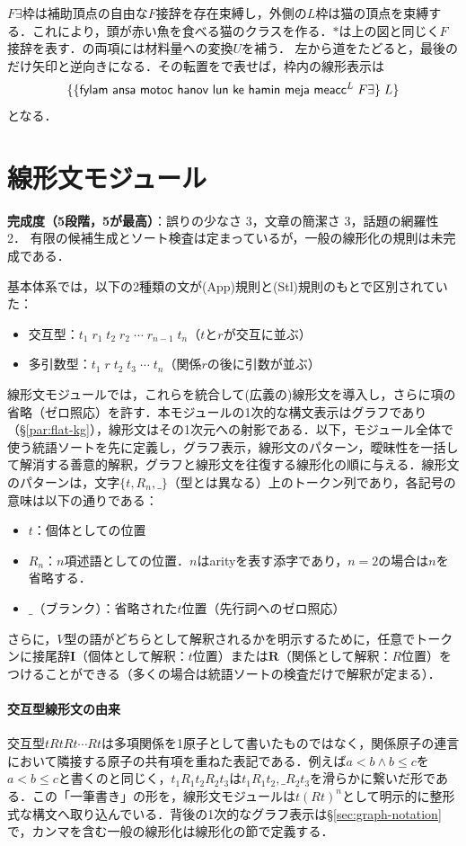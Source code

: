 \documentclass[../../main-detail.tex]{subfiles}
\begin{document}
$F\exists$枠は補助頂点の自由な$F$接辞を存在束縛し，外側の$L$枠は猫の頂点を束縛する．これにより，頭が赤い魚を食べる猫のクラスを作る．$*$は上の図と同じく$F$接辞を表す．の両項には材料量への変換$U$を補う．
左から道をたどると，最後のだけ矢印と逆向きになる．その転置をで表せば，枠内の線形表示は
\[
    \{\{\textsf{fylam ansa motoc hanov lun ke hamin meja }\textsf{meacc}^{L}\;F\exists\}\;L\}
\]
となる．

\section{線形文モジュール}
\begin{leftwavybox}
\textbf{完成度（5段階，5が最高）}：誤りの少なさ 3，文章の簡潔さ 3，話題の網羅性 2．
有限の候補生成とソート検査は定まっているが，一般の線形化の規則は未完成である．
\end{leftwavybox}
基本体系では，以下の2種類の文が(App)規則と(Stl)規則のもとで区別されていた：
\begin{itemize}
    \item 交互型：$t_1\; r_1\; t_2\; r_2\; \cdots\; r_{n-1}\; t_n$（$t$と$r$が交互に並ぶ）
    \item 多引数型：$t_1\; r\; t_2\; t_3\; \cdots\; t_n$（関係$r$の後に引数が並ぶ）
\end{itemize}
線形文モジュールでは，これらを統合して(広義の)線形文を導入し，さらに項の省略（ゼロ照応）を許す．本モジュールの1次的な構文表示はグラフであり（\S\ref{par:flat-kg}），線形文はその1次元への射影である．以下，モジュール全体で使う統語ソートを先に定義し，グラフ表示，線形文のパターン，曖昧性を一括して解消する善意的解釈，グラフと線形文を往復する線形化の順に与える．線形文のパターンは，文字$\{t, R_n,\_\}$（型とは異なる）上のトークン列であり，各記号の意味は以下の通りである：
\begin{itemize}
    \item $t$：個体としての位置
    \item $R_n$：$n$項述語としての位置．$n$はarityを表す添字であり，$n=2$の場合は$n$を省略する．
    \item $\_$（ブランク）：省略された$t$位置（先行詞へのゼロ照応）
\end{itemize}
さらに，$V$型の語がどちらとして解釈されるかを明示するために，任意でトークンに接尾辞$\mathbf{I}$（個体として解釈：$t$位置）または$\mathbf{R}$（関係として解釈：$R$位置）をつけることができる（多くの場合は統語ソートの検査だけで解釈が定まる）．

\paragraph{交互型線形文の由来}
交互型$tRtRt\cdots Rt$は多項関係を1原子として書いたものではなく，関係原子の連言において隣接する原子の共有項を重ねた表記である．例えば$a<b\land b\leq c$を$a<b\leq c$と書くのと同じく，$t_1R_1t_2R_2t_3$は$t_1R_1t_2\mathbin{,}\_R_2t_3$を滑らかに繋いだ形である．この「一筆書き」の形を，線形文モジュールは$t(Rt)^n$として明示的に整形式な構文へ取り込んでいる．背後の1次的なグラフ表示は\S\ref{sec:graph-notation}で，カンマを含む一般の線形化は線形化の節で定義する．
\end{document}
